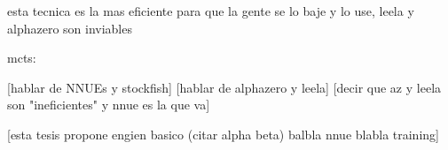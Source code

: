 esta tecnica es la mas eficiente para que la gente se lo baje y lo use, leela y alphazero son inviables

mcts: \cite{mcts-survey:2012}

[hablar de NNUEs y stockfish]
[hablar de alphazero y leela]
[decir que az y leela son "ineficientes" y nnue es la que va]

[esta tesis propone engien basico (citar alpha beta) balbla nnue blabla training]


